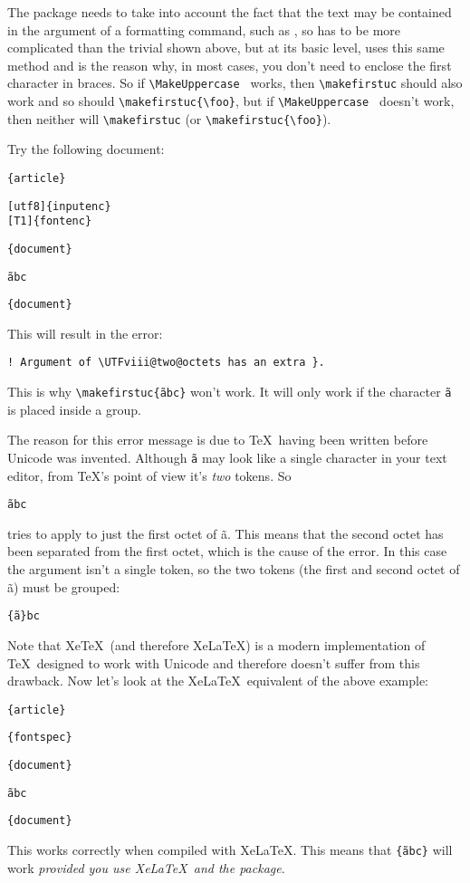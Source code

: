 \documentclass{nlctdoc}
\providecommand{\XeLaTeX}{XeLaTeX}
\providecommand{\XeTeX}{XeTeX}
\begin{document}
The  package needs to take into account the fact
that the text may be contained in the argument of a formatting
command, such as , so  has to be
more complicated than the trivial  shown above, but at
its basic level,  uses this same method and is the
reason why, in most cases, you don't need to enclose the first
character in braces. So if \verb|\MakeUppercase | works,
then \verb|\makefirstuc| should also work and so should
\verb|\makefirstuc{\foo|\verb|}|, but if 
\verb|\MakeUppercase | doesn't work, then neither will
\verb|\makefirstuc| 
(or \verb|\makefirstuc{\foo|\verb|}|).

Try the following document:
\begin{alltt}
\{article\}

[utf8]\{inputenc\}
[T1]\{fontenc\}

\{document\}

 \~abc

\{document\}
\end{alltt}

This will result in the error:
\begin{verbatim}
! Argument of \UTFviii@two@octets has an extra }.
\end{verbatim}
This is why \verb|\makefirstuc{|\texttt{\~abc}\verb|}| won't work.
It will only work if the character \texttt{\~a} is placed inside a
group.

The reason for this error message is due to \TeX\ having been written before
Unicode was invented. Although \texttt{\~a} may look like a single
character in your text editor, from \TeX's point of view it's \emph{two} 
tokens. So
\begin{alltt}
 \~abc
\end{alltt}
tries to apply  to just the first octet of \~a.
This means that the second octet has been separated from the first octet,
which is the cause of the error. In this case the argument isn't a
single token, so the two tokens (the first and second octet of \~a)
must be grouped:
\begin{alltt}
\{\~a\}bc
\end{alltt}

Note that \XeTeX\ (and therefore \XeLaTeX) is a modern
implementation of \TeX\ designed to work with Unicode and therefore
doesn't suffer from this drawback. Now let's look at the \XeLaTeX\
equivalent of the above example:
\begin{alltt}
\{article\}

\{fontspec\}

\{document\}

 \~abc

\{document\}
\end{alltt}

This works correctly when compiled with \XeLaTeX. This means
that \verb|{|\texttt{\~abc}\verb|}| will work
\emph{provided you use \XeLaTeX\ and the  package}.
\end{document}
